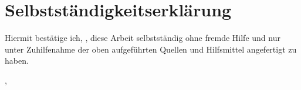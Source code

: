 \chapter{Selbstständigkeitserklärung}

Hiermit bestätige ich, \getauthor, diese Arbeit selbstständig ohne fremde Hilfe und nur unter Zuhilfenahme der oben aufgeführten Quellen und Hilfsmittel angefertigt zu haben.

\vspace{3cm}

\noindent\getauthor, \getdate
